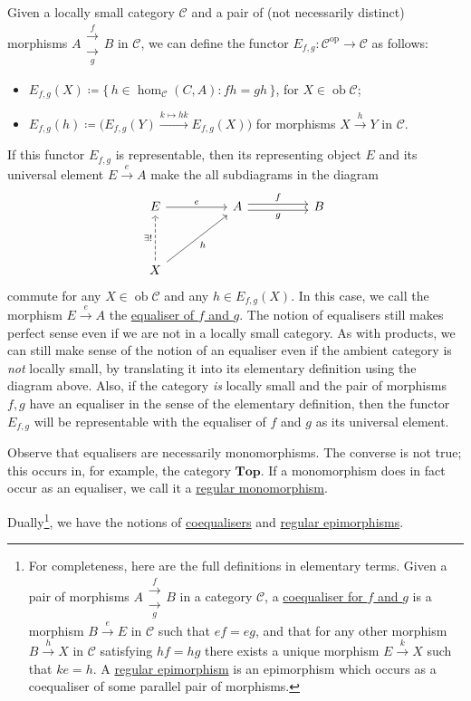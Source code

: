 \documentclass[a4paper,11pt]{article}
\theoremstyle{break_italics}
\theoremstyle{break_upright}
\theoremstyle{remark}
\newcommand{\ob}{\operatorname{ob}}
\newcommand{\C}{\mathcal{C}}
\newcommand{\op}{\mathrm{op}}
\begin{document}
Given a locally small category $\C$ and a pair of (not necessarily distinct) morphisms $A \substack{\xrightarrow{f} \\ \xrightarrow[g]{}} B$ in $\C$, we can define the functor $E_{f,g} \colon \C^\op \to \C$ as follows:
\begin{itemize}
	\item $E_{f,g}(X) \coloneqq \{\,h \in \hom_\C(C,A) : fh = gh\,\}$, for $X \in \ob\C$;
	\item $E_{f,g}(h) \coloneqq \big( E_{f,g}(Y) \xrightarrow{k \mapsto hk} E_{f,g}(X) \big)$ for morphisms $X \xrightarrow{h} Y$ in $\C$.
\end{itemize}
If this functor $E_{f,g}$ is representable, then its representing object $E$ and its universal element $E \xrightarrow{e} A$ make the all subdiagrams in the diagram
\[
\begin{tikzcd}
E \arrow[rr, "e"]                                   &  & A \arrow[rr, "f", shift left] \arrow[rr, "g"', shift right] &  & B \\
                                                    &  &                                                             &  &   \\
X \arrow[rruu, "h"'] \arrow[uu, "\exists!", dashed] &  &                                                             &  &  
\end{tikzcd}
\]
commute for any $X \in \ob\C$ and any $h \in E_{f,g}(X)$. In this case, we call the morphism $E \xrightarrow{e} A$ the \uline{equaliser of $f$ and $g$}. The notion of equalisers still makes perfect sense even if we are not in a locally small category. As with products, we can still make sense of the notion of an equaliser even if the ambient category is \textit{not} locally small, by translating it into its elementary definition using the diagram above. Also, if the category \textit{is} locally small and the pair of morphisms $f,g$ have an equaliser in the sense of the elementary definition, then the functor $E_{f,g}$ will be representable with the equaliser of $f$ and $g$ as its universal element.

Observe that equalisers are necessarily monomorphisms. The converse is not true; this occurs in, for example, the category $\mathbf{Top}$. If a monomorphism does in fact occur as an equaliser, we call it a \uline{regular monomorphism}.

Dually\footnote{For completeness, here are the full definitions in elementary terms. Given a pair of morphisms $A \substack{\xrightarrow{f} \\ \xrightarrow[g]{}} B$ in a category $\C$, a \uline{coequaliser for $f$ and $g$} is a morphism $B \xrightarrow{e} E$ in $\C$ such that $ef = eg$, and that for any other morphism $B \xrightarrow{h} X$ in $\C$ satisfying $hf = hg$ there exists a unique morphism $E \xrightarrow{k} X$ such that $ke = h$. A \uline{regular epimorphism} is an epimorphism which occurs as a coequaliser of some parallel pair of morphisms.}, we have the notions of \uline{coequalisers} and \uline{regular epimorphisms}.
\end{document}
